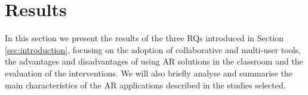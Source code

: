 \section{Results} \label{sec:results}

In this section we present the results of the three \glspl{RQ} introduced in Section \ref{sec:introduction}, focusing on the adoption of collaborative and multi-user tools, the advantages and disadvantages of using \gls{AR} solutions in the classroom and the evaluation of the interventions. We will also briefly analyse and summarise the main characteristics of the \gls{AR} applications described in the studies selected.










